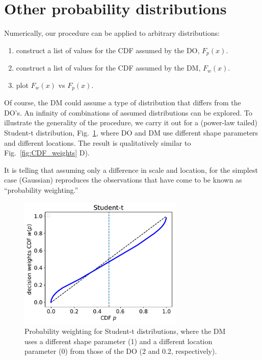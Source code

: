 \documentclass[11pt]{article}
\newcommand{\flabel}[1]{\label{fig:#1}}
\newcommand{\fref}[1]{Fig.~\ref{fig:#1}}
\numberwithin{equation}{section}
\begin{document}
\section{Other probability distributions}
Numerically, our procedure can be applied to arbitrary distributions: 
\begin{enumerate}
\item
construct a list of values for the CDF assumed by the DO, $F_p(x)$.
\item
construct a list of values for the CDF assumed by the DM, $F_w(x)$.
\item
plot $F_w(x)$ vs $F_p(x)$.
\end{enumerate}
Of course, the DM could assume a type of distribution that differs from the DO's. An infinity of combinations of assumed distributions can be explored. To illustrate the generality of the procedure, we carry it out for a (power-law tailed) Student-t distribution, \fref{other_CDFs}, where DO and DM use different shape parameters and different locations. The result is qualitatively similar to \fref{CDF_weights} D). 

It is telling that assuming only a difference in scale and location, for the simplest case (Gaussian) reproduces the observations that have come to be known as ``probability weighting.''

\begin{figure}
\centering
\includegraphics[width=0.7\textwidth]{./figs/Student-t.pdf}
\caption{Probability weighting for Student-t distributions, where the DM uses a different shape parameter (1) and a different location parameter (0) from those of the DO (2 and 0.2, respectively).}
\flabel{other_CDFs}
\end{figure}

\clearpage
%
\end{document}
